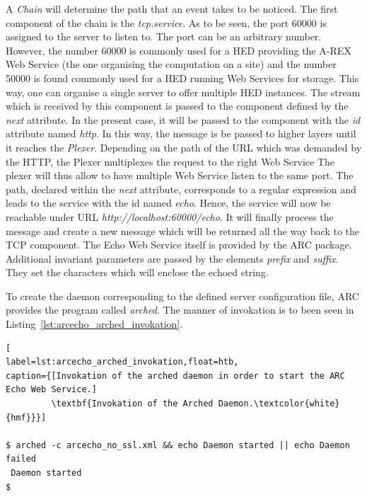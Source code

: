 A \textit{Chain} will determine the path that an event takes to be noticed.
The first component of the chain is the \textit{tcp.service}.
As to be seen, the port 60000 is assigned to the server to listen to.
The port can be an arbitrary number.
However, the number 60000 is commonly used for a HED providing the A-REX Web Service (the one organising the computation on a site) and the number 50000 is found commonly used for a HED running Web Services for storage.
This way, one can organise a single server to offer multiple HED instances.
The stream which is received by this component is passed to the component defined by the \textit{next} attribute.
In the present case, it will be passed to the component with the \textit{id} attribute named \textit{http}.
In this way, the message is be passed to higher layers until it reaches the \textit{Plexer}.
Depending on the path of the URL which was demanded by the HTTP, the Plexer multiplexes the request to the right Web Service
The plexer will thus allow to have multiple Web Service listen to the same port.
The path, declared within the \textit{next} attribute, corresponds to a regular expression and leads to the service with the id named \textit{echo}. 
Hence, the service will now be reachable under URL \textit{http://localhost:60000/echo}.
It will finally process the message and create a new message which will be returned all the way back to the TCP component.
The Echo Web Service itself is provided by the ARC package.
Additional invariant parameters are passed by the elements \textit{prefix} and \textit{suffix}.
They set the characters which will enclose the echoed string.

To create the daemon corresponding to the defined server configuration file, ARC provides the program called \textit{arched}.
The manner of invokation is to been seen in Listing~\ref{lst:arcecho_arched_invokation}.
\begin{lstlisting}[
label=lst:arcecho_arched_invokation,float=htb,
caption={[Invokation of the arched daemon in order to start the ARC Echo Web Service.]
         \textbf{Invokation of the Arched Daemon.\textcolor{white}{hmf}}}]

$ arched -c arcecho_no_ssl.xml && echo Daemon started || echo Daemon failed
 Daemon started
$
\end{lstlisting}

